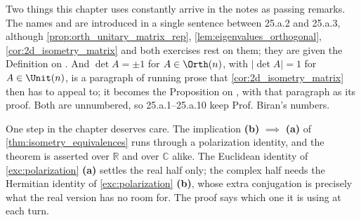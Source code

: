 
\begin{ainote}
Two things this chapter uses constantly arrive in the notes as passing remarks.
The names  and 
are introduced in a single sentence between 25.a.2 and 25.a.3, although
\cref{prop:orth_unitary_matrix_rep}, \cref{lem:eigenvalues_orthogonal},
\cref{cor:2d_isometry_matrix} and both exercises rest on them; they are given
the Definition on . And
$\det A = \pm 1$ for $A \in \Orth(n)$, with $|\det A| = 1$ for $A \in \Unit(n)$,
is a paragraph of running prose that \cref{cor:2d_isometry_matrix} then has to
appeal to; it becomes the Proposition on
, with that paragraph as its proof. Both
are unnumbered, so 25.a.1--25.a.10 keep Prof. Biran's numbers.

One step in the chapter deserves care. The implication \textbf{(b)}
$\implies$ \textbf{(a)} of \cref{thm:isometry_equivalences} runs through a
polarization identity, and the theorem is asserted over $\mathbb{R}$ and over
$\mathbb{C}$ alike. The Euclidean identity of \cref{exc:polarization}
\textbf{(a)} settles the real half only; the complex half needs the Hermitian
identity of \cref{exc:polarization} \textbf{(b)}, whose extra conjugation is
precisely what the real version has no room for. The proof says which one it is
using at each turn.
\end{ainote}


